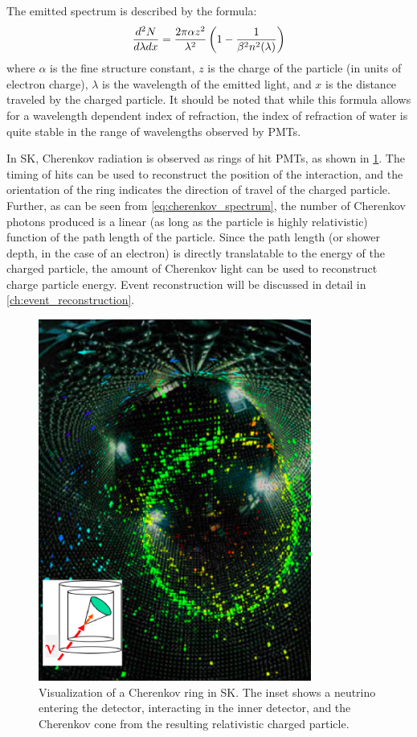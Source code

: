 The emitted spectrum is described by the formula\cite{Olive:2016xmw}:
 \begin{equation}
\frac{d^2N}{d\lambda dx}=\frac{2\pi \alpha z^2}{\lambda^2}\left(1-\frac{1}{\beta^2n^2(\lambda)}\right)
\label{eq:cherenkov_spectrum}
\end{equation}
where $\alpha$ is the fine structure constant, $z$ is the charge of the particle (in units of electron charge), $\lambda$ is the wavelength of the emitted light, and $x$ is the distance traveled by the charged particle.  It should be noted that while this formula allows for a wavelength dependent index of refraction, the index of refraction of water is quite stable in the range of wavelengths observed by PMTs.\par
In SK, Cherenkov radiation is observed as rings of hit PMTs, as shown in \cref{fig:cherenkov_cone}.  The timing of hits can be used to reconstruct the position of the interaction, and the orientation of the ring indicates the direction of travel of the charged particle.  Further, as can be seen from \cref{eq:cherenkov_spectrum}, the number of Cherenkov photons produced is a linear (as long as the particle is highly relativistic) function of the path length of the particle.  Since the path length (or shower depth, in the case of an electron) is directly translatable to the energy of the charged particle, the amount of Cherenkov light can be used to reconstruct charge particle energy.  Event reconstruction will be discussed in detail in \cref{ch:event_reconstruction}. 


\begin{figure}
\centering
\includegraphics[width=0.8\textwidth]{figures/cherenkov_ring_piotr.png}
\caption{Visualization of a Cherenkov ring in SK.  The inset shows a neutrino entering the detector, interacting in the inner detector, and the Cherenkov cone from the resulting relativistic charged particle. \cite{Mijakowski:2011zz}}
\label{fig:cherenkov_cone}
\end{figure}

   
